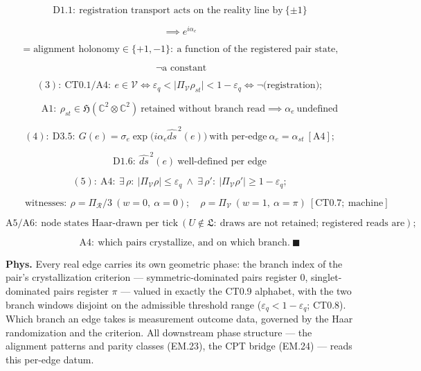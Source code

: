 \begin{theorem}
\[
\mathrm{D1.1}:\ \text{registration transport acts on the reality line by}\ \{\pm1\}
\]

\[
\implies e^{i\alpha_e}
\]

\[
= \text{alignment holonomy}\in\{+1,-1\}:\ \text{a function of the registered pair state},
\]

\[
\ \neg\text{a constant}
\]

\[
(3):\ \mathrm{CT0.1}/\mathrm{A4}:\ e\in\mathcal V\iff\varepsilon_q<\bigl|\Pi_{\mathcal V}\rho_{st}\bigr|<1-\varepsilon_q\iff\neg\bigl(\text{registration}\bigr);
\]

\[
\qquad \mathrm{A1}:\ \rho_{st}\in\mathfrak H(\mathbb C^2\otimes\mathbb C^2)\ \text{retained without branch read}\implies\alpha_e\ \text{undefined}
\]

\[
(4):\ \mathrm{D3.5}:\ G(e)=\sigma_e\exp\bigl(i\alpha_e\widehat{ds}^{\,2}(e)\bigr)\ \text{with per-edge}\ \alpha_e=\alpha_{st}\ [\mathrm{A4}];
\]

\[
\qquad \mathrm{D1.6}:\ \widehat{ds}^{\,2}(e)\ \text{well-defined per edge}
\]

\[
(5):\ \mathrm{A4}:\ \exists\,\rho:\ \bigl|\Pi_{\mathcal V}\rho\bigr|\le\varepsilon_q\ \wedge\ \exists\,\rho':\ \bigl|\Pi_{\mathcal V}\rho'\bigr|\ge1-\varepsilon_q;
\]

\[
\qquad \text{witnesses}:\ \rho=\Pi_{\mathcal R}/3\ (w=0,\ \alpha=0);\quad \rho=\Pi_{\mathcal V}\ (w=1,\ \alpha=\pi)\ [\mathrm{CT0.7};\ \text{machine}]
\]

\[
\mathrm{A5}/\mathrm{A6}:\ \text{node states Haar-drawn per tick}\ (U\notin\mathfrak L:\ \text{draws are not retained; registered reads are});
\]

\[
\qquad \mathrm{A4}:\ \text{which pairs crystallize, and on which branch}.\ \blacksquare
\]

\textbf{Phys.} Every real edge carries its own geometric phase: the branch index of the pair's crystallization criterion — symmetric-dominated pairs register $0$, singlet-dominated pairs register $\pi$ — valued in exactly the CT0.9 alphabet, with the two branch windows disjoint on the admissible threshold range ($\varepsilon_q<1-\varepsilon_q$; CT0.8). Which branch an edge takes is measurement outcome data, governed by the Haar randomization and the criterion. All downstream phase structure — the alignment patterns and parity classes (EM.23), the CPT bridge (EM.24) — reads this per-edge datum.

\end{theorem}

